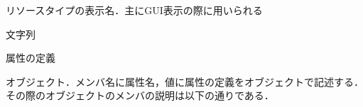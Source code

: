 \begin{description}
{\nopagebreak
\item[\texttt{DisplayName}] \mbox{}
    \vspace{-1zw}
    \begin{description}
    \setlength{\itemsep}{-1.5\itemsep}
    \item[説明] リソースタイプの表示名．主にGUI表示の際に用いられる
    \item[値] 文字列
    \end{description}
}
\item[\texttt{Attributes}] \mbox{}
    \vspace{-1zw}
    \begin{description}
    \setlength{\itemsep}{-1.5\itemsep}
    \item[説明] 属性の定義
    \item[値] オブジェクト．メンバ名に属性名，値に属性の定義をオブジェクトで記述する．その際のオブジェクトのメンバの説明は以下の通りである．
    

\end{description}
\end{description}
